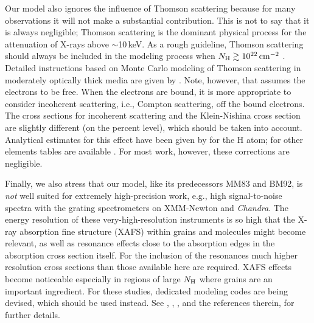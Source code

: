 \documentclass{aastex}
\newcommand{\nH}{\ensuremath{N_{\rm H}}}
\begin{document}
Our model also ignores the influence of Thomson scattering
because for many observations it will not make a substantial
contribution.  This is not to say that it is always negligible;
Thomson scattering is the dominant physical process for the
attenuation of X-rays above $\sim$10\,keV. As a rough guideline,
Thomson scattering should always be included in the modeling
process when $N_{\rm H} \gtrsim 10^{22}\,\rm cm^{-2}$ \citep[see,
e.g.,][]{stelzer:98a}.  Detailed instructions based on Monte
Carlo modeling of Thomson scattering in moderately optically
thick media are given by \citet{yaqoob:97a}. Note, however, that
\citeauthor{yaqoob:97a} assumes the electrons to be free. When
the electrons are bound, it is more appropriate to consider
incoherent scattering, i.e., Compton scattering, off the bound
electrons. The cross sections for incoherent scattering and the
Klein-Nishina cross section are slightly different (on the
percent level), which should be taken into account.  Analytical
estimates for this effect have been given by \citet{gorshkov:73a}
for the H atom; for other elements tables are available
\citep{hubbell:75a,henke:93a}. For most work, however, these
corrections are negligible.

Finally, we also stress that our model, like its predecessors MM83 and
BM92, is \emph{not} well suited for extremely high-precision work,
e.g., high signal-to-noise spectra with the grating spectrometers on
XMM-Newton and \textsl{Chandra}. The energy resolution of these
very-high-resolution instruments is so high that the X-ray absorption
fine structure (XAFS) within grains and molecules might become
relevant, as well as resonance effects close to the absorption edges
in the absorption cross section itself. For the inclusion of the
resonances much higher resolution cross sections than those available
here are required. XAFS effects become noticeable especially in
regions of large $\nH$ where grains are an important ingredient.  For
these studies, dedicated modeling codes are being devised, which
should be used instead.  See \citet{forrey:98a}, \citet{woo:97a},
\citet{woo:95a}, and the references therein, for further details.
\end{document}
